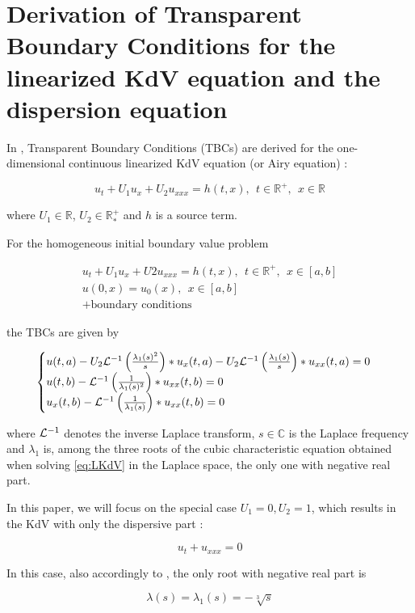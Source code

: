 \section{Derivation of Transparent Boundary Conditions for the linearized KdV equation and the dispersion equation}

\indent In \cite{besse2015}, Transparent Boundary Conditions (TBCs) are derived for the one-dimensional continuous linearized KdV equation (or Airy equation) :

\begin{equation}
 	\label{eq:LKdV}
 	u_t + U_1u_x + U_2u_{xxx} = h(t,x), \ \ t \in \mathbb{R}^+, \ \ x \in \mathbb{R}
\end{equation}

\noindent where $U_1 \in \mathbb{R}$, $U_2 \in \mathbb{R}^+_*$ and $h$ is a source term.

\indent For the homogeneous initial boundary value problem 

\begin{gather}
	u_t + U_1u_x + U2u_{xxx} = h(t,x), \ \ t \in \mathbb{R}^+, \ \ x \in [a,b] \\
	u(0,x) = u_0(x), \ \ x \in [a,b] \\
	+ \text{boundary conditions} \nonumber
\end{gather}

\noindent the TBCs are given by 

\begin{equation}
\label{eq:continuousTBC}
\begin{cases}
        u(t,a) - U_2 \mathcal{L}^{-1} \left( \frac{\lambda_1(s)^2}{s} \right) * u_x(t,a) - U_2 \mathcal{L}^{-1} \left( \frac{\lambda_1(s)}{s} \right) * u_{xx}(t,a) = 0 \\ 
        u(t,b) - \mathcal{L}^{-1} \left( \frac{1}{\lambda_1(s)^2} \right) * u_{xx}(t,b) = 0 \\
        u_x(t,b) - \mathcal{L}^{-1} \left( \frac{1}{\lambda_1(s)} \right) * u_{xx}(t,b) = 0 
\end{cases}
\end{equation}

\noindent where $\mathcal{L}^{-1}$ denotes the inverse Laplace transform, $s \in \mathbb{C}$ is the Laplace frequency and $\lambda_1$ is, among the three roots of the cubic characteristic equation obtained when solving \eqref{eq:LKdV} in the Laplace space, the only one with negative real part.

\indent In this paper, we will focus on the special case $U_1 = 0, U_2 = 1$, which results in the KdV with only the dispersive part : 

\begin{equation}
	\label{eq:DKdV}
	u_t + u_{xxx} = 0
\end{equation}

\indent In this case, also accordingly to \cite{besse2015}, the only root with negative real part is 

\begin{equation}
	\label{eq:lambda}
			\lambda(s) = \lambda_1(s) =  -\sqrt[3]{s} 
\end{equation}